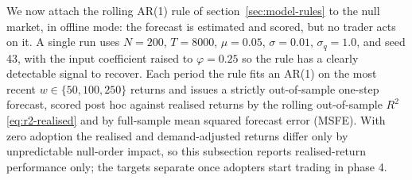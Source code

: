 \documentclass[12pt]{article}
\begin{document}
We now attach the rolling AR(1) rule of section~\ref{sec:model-rules} to the null market, in offline mode: the forecast is estimated and scored, but no trader acts on it. A single run uses $N=200$, $T=8000$, $\mu=0.05$, $\sigma=0.01$, $\sigma_q=1.0$, and seed 43, with the input coefficient raised to $\varphi=0.25$ so the rule has a clearly detectable signal to recover. %
Each period the rule fits an AR(1) on the most recent $w \in \{50, 100, 250\}$ returns and issues a strictly out-of-sample one-step forecast, scored post hoc against realised returns by the rolling out-of-sample $R^{2}$ \eqref{eq:r2-realised} and by full-sample mean squared forecast error (MSFE). %
With zero adoption the realised and demand-adjusted returns differ only by unpredictable null-order impact, so this subsection reports realised-return performance only; the targets separate once adopters start trading in phase 4. %
\end{document}
